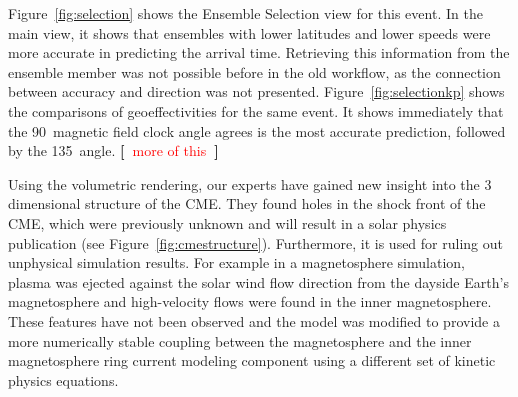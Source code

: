 \documentclass[journal]{vgtc}                %
\newcommand{\todo}[1] {\textbf{[~}\textcolor {red}{#1}\marginpar{\textcolor {red}{\centerline{{\Huge \textbf{!}}}}}\textbf{~]}}
\newcommand{\todo}[1] {\textbf{[~}\textcolor {red}{#1}\marginpar{\textcolor {red}{\centerline{{\Huge \textbf{!}}}}}\textbf{~]}}
\begin{document}
Figure~\ref{fig:selection} shows the Ensemble Selection view for this event. In the main view, it shows that ensembles with lower latitudes and lower speeds were more accurate in predicting the arrival time. Retrieving this information from the ensemble member was not possible before in the old workflow, as the connection between accuracy and direction was not presented. Figure~\ref{fig:selectionkp} shows the comparisons of geoeffectivities for the same event. It shows immediately that the 90\degree\ magnetic field clock angle agrees is the most accurate prediction, followed by the 135\degree\ angle. \todo{more of this}

Using the volumetric rendering, our experts have gained new insight into the 3 dimensional structure of the CME. They found holes in the shock front of the CME, which were previously unknown and will result in a solar physics publication (see Figure~\ref{fig:cmestructure}). Furthermore, it is used for ruling out unphysical simulation results. For example in a magnetosphere simulation, plasma was ejected against the solar wind flow direction from the dayside Earth's magnetosphere and high-velocity flows were found in the inner magnetosphere. These features have not been observed and the model was modified to provide a more numerically stable coupling between the magnetosphere and the inner magnetosphere ring current modeling component using a different set of kinetic physics equations.
\end{document}
